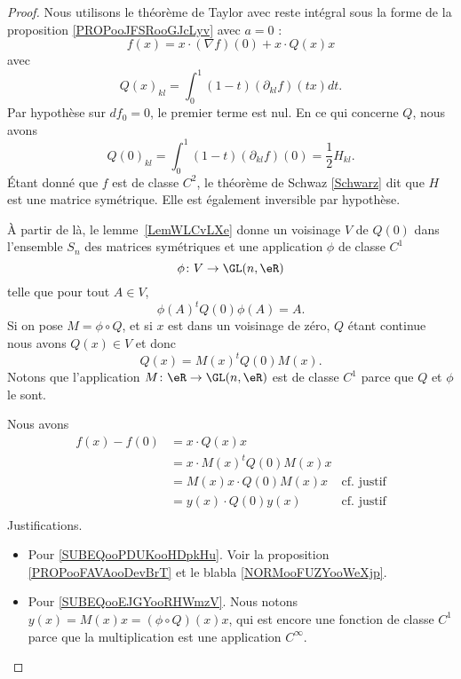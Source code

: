 \begin{proof}

	Nous utilisons le théorème de Taylor avec reste intégral sous la forme de la proposition \ref{PROPooJFSRooGJcLyv} avec \( a=0\) :
	\begin{equation}
		f(x)=x\cdot (\nabla f)(0)+x\cdot Q(x)x
	\end{equation}
	avec
	\begin{equation}
		Q(x)_{kl}=\int_0^1(1-t)(\partial_{kl}f)(tx)dt.
	\end{equation}
	Par hypothèse sur \( df_0=0\), le premier terme est nul. En ce qui concerne \( Q\), nous avons
	\begin{equation}
		Q(0)_{kl}=\int_0^1(1-t)(\partial_{kl}f)(0)=\frac{ 1 }{2}H_{kl}.
	\end{equation}
	Étant donné que \( f\) est de classe \( C^2\), le théorème de Schwaz \ref{Schwarz} dit que \( H\) est une matrice symétrique. Elle est également inversible par hypothèse.

	À partir de là, le lemme~\ref{LemWLCvLXe} donne un voisinage \( V\) de \( Q(0)\) dans l'ensemble \( S_n\) des matrices symétriques et une application \( \phi\) de classe \( C^1\)
	\begin{equation}
		\phi\colon V\to \GL(n,\eR) \\
	\end{equation}
	telle que pour tout \( A\in V\),
	\begin{equation}
		\phi(A)^tQ(0)\phi(A)=A.
	\end{equation}
	Si on pose \( M=\phi\circ Q\), et si \( x\) est dans un voisinage de zéro, \( Q\) étant continue nous avons \( Q(x)\in V\) et donc
	\begin{equation}
		Q(x)=M(x)^tQ(0)M(x).
	\end{equation}
	Notons que l'application \( M\colon \eR\to \GL(n,\eR)\) est de classe \( C^1\) parce que \( Q\) et \( \phi\) le sont.

	Nous avons
	\begin{subequations}
		\begin{align}
			f(x)-f(0) & = x\cdot Q(x)x                                                          \\
			          & = x\cdot M(x)^tQ(0)M(x)x                                                \\
			          & = M(x)x\cdot Q(0)M(x)x   & \text{cf. justif}	\label{SUBEQooPDUKooHDpkHu} \\
			          & = y(x)\cdot Q(0)y(x)     & \text{cf. justif}	\label{SUBEQooEJGYooRHWmzV} \\
		\end{align}
	\end{subequations}
	Justifications.
	\begin{itemize}
		\item
		      Pour \ref{SUBEQooPDUKooHDpkHu}. Voir la proposition \ref{PROPooFAVAooDevBrT} et le blabla \ref{NORMooFUZYooWeXjp}.
		\item	 Pour \ref{SUBEQooEJGYooRHWmzV}. Nous notons \( y(x)=M(x)x=(\phi\circ Q)(x)x\), qui est encore une fonction de classe \( C^1\) parce que la multiplication est une application \(  C^{\infty}\).
	\end{itemize}


\end{proof}
